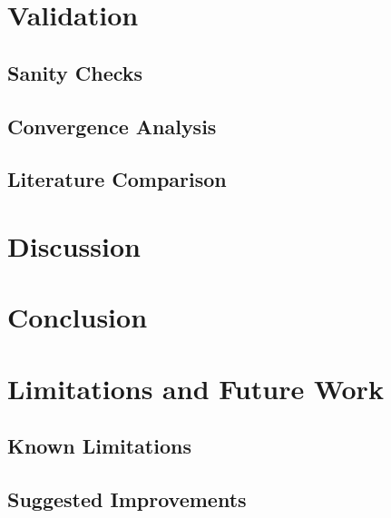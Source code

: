\documentclass[aps,pra,twocolumn,reprint,amsmath,amssymb]{revtex4-2}
\begin{document}
\section{Validation}

\subsection{Sanity Checks}

\subsection{Convergence Analysis}

\subsection{Literature Comparison}

\section{Discussion}

\section{Conclusion}

\section{Limitations and Future Work}

\subsection{Known Limitations}

\subsection{Suggested Improvements}
\end{document}
